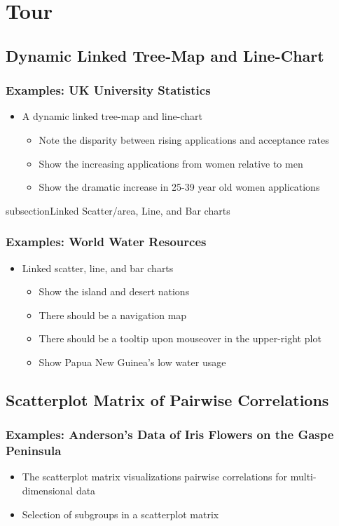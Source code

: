 \documentclass{beamer}
\begin{document}
\section{Tour}


\subsection{Dynamic Linked Tree-Map and Line-Chart}

\begin{frame}
\frametitle{Examples: UK University Statistics}
\begin{itemize}
\item A dynamic linked tree-map and line-chart
    \begin{itemize}
    \item Note the disparity between rising applications and acceptance rates
    \item Show the increasing applications from women relative to men
    \item Show the dramatic increase in 25-39 year old women applications
    \end{itemize}
\end{itemize}
\end{frame}


subsection{Linked Scatter/area, Line, and Bar charts}

\begin{frame}
\frametitle{Examples: World Water Resources}
\begin{itemize}
\item Linked scatter, line, and bar charts
    \begin{itemize}
    \item Show the island and desert nations
    \item There should be a navigation map
    \item There should be a tooltip upon mouseover in the upper-right plot
    \item Show Papua New Guinea's low water usage
    \end{itemize}
\end{itemize}
\end{frame}


\subsection{Scatterplot Matrix of Pairwise Correlations}


\begin{frame}
\frametitle{Examples: Anderson's Data of Iris Flowers on the Gaspe Peninsula}
\begin{itemize}
\item The scatterplot matrix visualizations pairwise correlations for multi-dimensional data
\item Selection of subgroups in a scatterplot matrix
\end{itemize}
\end{frame}
\end{document}
